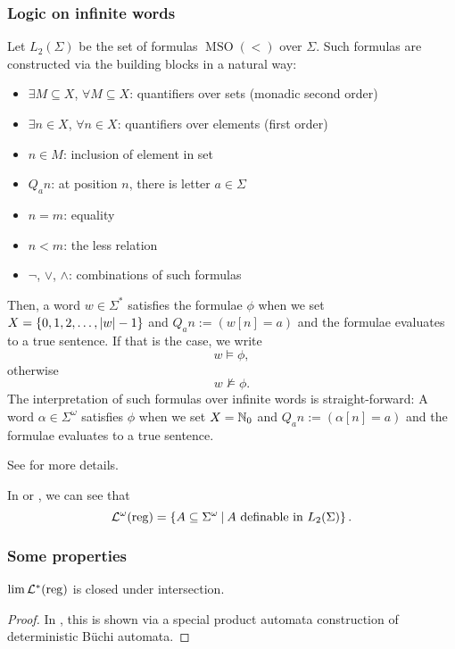 \subsubsection{Logic on infinite words}
Let $L_2(\Sigma)$ be the set of formulas $\operatorname{MSO}(<)$ over $\Sigma$. Such formulas are constructed via the building blocks in a natural way:
\begin{itemize}
\item $\exists M \subseteq X$, $\forall M \subseteq X$: quantifiers over sets (monadic second order)
\item $\exists n \in X$, $\forall n \in X$: quantifiers over elements (first order)
\item $n \in M$: inclusion of element in set
\item $Q_a n$: at position $n$, there is letter $a \in \Sigma$
\item $n = m$: equality
\item $n < m$: the less relation
\item $\neg$, $\vee$, $\wedge$: combinations of such formulas
\end{itemize}
Then, a word $w \in \Sigma^*$ satisfies the formulae $\phi$ when we set $X = \Set{0,1,2,\dots,\left|w\right|-1}$ and $Q_a n := (w[n] = a)$ and the formulae evaluates to a true sentence. If that is the case, we write
\[ w \models \phi , \]
otherwise
\[ w \not\models \phi . \]
The interpretation of such formulas over infinite words is straight-forward: A word $\alpha \in \Sigma^\omega$ satisfies $\phi$ when we set $X = \mathbb{N}_0$ and $Q_a n := (\alpha[n] = a)$ and the formulae evaluates to a true sentence.

See \cite{FinAutLogR109} for more details.

In \cite[Theorem 3.1]{CombR107} or \cite{FinAutLogR109}, we can see that
\[ \LangOreg = \Set{A \subseteq \Sigma^\omega}{A \text{ definable in } L_2(\Sigma)} . \]

\subsubsection{Some properties}

\begin{lemma}
\label{reg:limRegClosedIntersection}
$\lim \mathcal{L}^*(\textup{\textrm{reg}})$ is closed under intersection.
\begin{proof}
In \cite[Chapter 12, Remark 12.4]{CAVR112}, this is shown via a special product automata construction of deterministic Büchi automata.
\end{proof}
\end{lemma}

